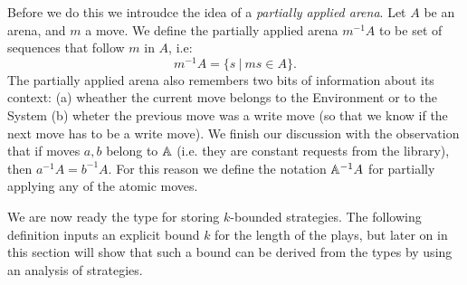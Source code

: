 Before we do this we introudce the idea of a \emph{partially applied arena}.
Let $A$ be an arena, and $m$ a move. We define the partially applied arena ${m^{-1}}A$ 
to be set of sequences that follow $m$ in $A$, i.e:
\[m^{-1}A = \{s \ | \ ms \in A \}.\]
The partially applied arena also remembers two bits of information about its context: (a) wheather the current move belongs to the Environment or to the System
(b) wheter the previous move was a write move (so that we know if the next move has to be a write move). We finish our discussion with the observation 
that if moves $a, b$ belong to $\mathbb A$ (i.e. they are constant requests from the library), then $a^{-1}A = b^{-1}A$. 
For this reason we define the notation $\mathbb A^{-1}A$ for partially applying any of the atomic moves. 


We are now ready the type for storing $k$-bounded strategies.  The following definition inputs an explicit bound $k$ for the length of the plays, but later on in this section will show that such a bound can be derived from the types by using an analysis of strategies.
